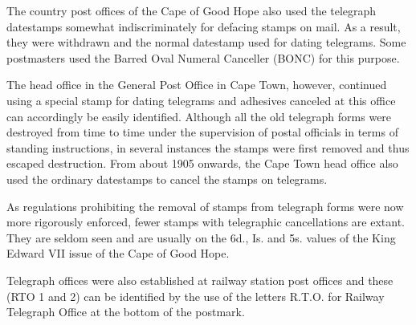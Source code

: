 The country post offices of the Cape of Good Hope also used the telegraph 
datestamps somewhat indiscriminately for defacing stamps on mail. As a result, 
they were withdrawn and the normal datestamp used for dating telegrams. 
Some postmasters used the Barred Oval Numeral Canceller (BONC) for this purpose.

The head office in the General Post Office in Cape Town, however, continued using a special stamp for dating telegrams and adhesives canceled at this office can accordingly be easily identified. Although all the old telegraph forms were destroyed from time to time under the supervision of postal officials in terms of standing instructions, in several instances the stamps were first removed and thus escaped destruction. From about 1905 onwards, the Cape Town head office also used the ordinary datestamps to cancel the stamps on telegrams.

As regulations prohibiting the removal of stamps from telegraph forms were now more rigorously enforced, 
fewer stamps with telegraphic cancellations are extant. 
They are seldom seen and are usually on the 6d., Is. and 5s. values of 
the King Edward VII issue of the Cape of Good Hope. 

Telegraph offices were also established at railway station post 
offices and these (RTO 1 and 2) can be identified by the use of 
the letters R.T.O. for Railway Telegraph Office at the bottom of the postmark.  
    



          